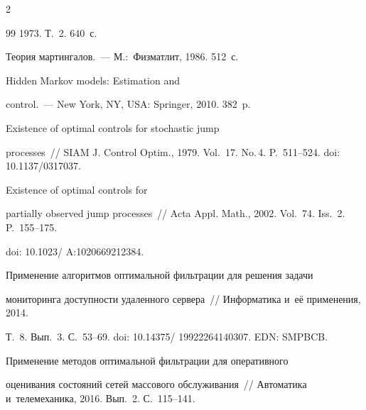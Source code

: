 \begin{multicols}{2}
{{\begin{thebibliography}{99}
1973.  Т.~2. 640~с.







 Теория мартингалов.~--- М.:~Физматлит, 1986. 512~с.







 Hidden Markov models: Estimation and 


control.~--- New York, NY, USA: Springer, 2010. 382~p.







 Existence of optimal controls for stochastic jump 


processes~// SIAM J. Control Optim., 1979. Vol.~17. No.\,4. P.~511--524. doi: 10.1137/0317037.







 Existence of optimal controls for 


partially observed jump processes~// Acta Appl. Math., 2002. Vol.~74. Iss.~2. P.~155--175.


doi: 10.1023/ A:1020669212384.







 Применение алгоритмов оптимальной фильтрации для решения задачи 


мониторинга доступности удаленного сервера~// Информатика и~её применения, 2014. 


Т.~8. Вып.~3. С.~53--69. doi: 10.14375/ 19922264140307. EDN: SMPBCB.










 Применение методов оптимальной фильтрации для оперативного 


оценивания состояний сетей массового обслуживания~// Автоматика и~телемеханика, 2016. Вып.~2. С.~115--141. 






\end{thebibliography}}}
\end{multicols}
